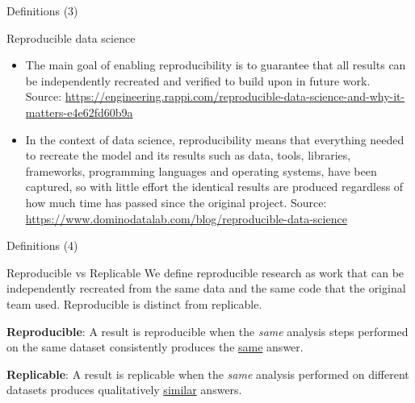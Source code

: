 \documentclass[10pt,aspectratio=169]{beamer} %
\begin{document}
\begin{frame}[label=frame6]{Definitions (3)}
	\begin{alertblock}{Reproducible data science}
		\begin{itemize}
			\item The main goal of enabling reproducibility is to guarantee that all results can be independently recreated and verified to build upon in future work.\\
			Source: \url{https://engineering.rappi.com/reproducible-data-science-and-why-it-matters-e4e62fd60b9a}
			\item In the context of data science, reproducibility means that everything needed to recreate the model and its results such as data, tools, libraries, frameworks, programming languages and operating systems, have been captured, so with little effort the identical results are produced regardless of how much time has passed since the original project.
			Source: \url{https://www.dominodatalab.com/blog/reproducible-data-science}
		\end{itemize}	
	\end{alertblock}
\end{frame}
\begin{frame}[label=frame7]{Definitions (4)}
	\begin{alertblock}{Reproducible vs Replicable}
			We define reproducible research as work that can be independently recreated from the same data and the same code that the original team used. 
			Reproducible is distinct from replicable.
			\vspace{5mm}
			
			\textbf{Reproducible}: A result is reproducible when the \emph{same} analysis steps performed on the \alert{same dataset} consistently produces the \underline{same} answer.
			
			\textbf{Replicable}: A result is replicable when the \emph{same} analysis performed on \alert{different datasets} produces qualitatively \underline{similar} answers.
	\end{alertblock}
\end{frame}
\end{document}
